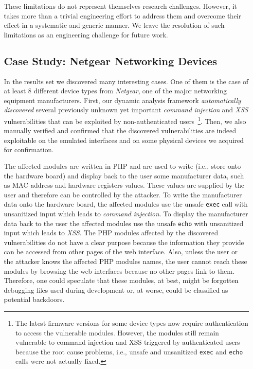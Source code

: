 \documentclass[conference]{./templates/ndss/IEEEtran}
\newcounter{t0d0_counter}
\newcounter{pr00f_counter}
\begin{document}
These limitations do not represent themselves research challenges. 
However, it takes more than a trivial engineering effort to address them 
and overcome their effect in a systematic and generic manner. 
We leave the resolution of such limitations as an engineering challenge 
for future work. 





\subsection{Case Study: Netgear Networking Devices}
\label{sec:discuss-casestudy-cmdinj}

\newcommand{\NetgearDeviceTypes}{8}

In the results set we discovered many interesting cases. One of them is the 
case of at least \NetgearDeviceTypes{} different device types from \emph{Netgear}, 
one of the major networking equipment manufacturers. 
First, our dynamic analysis framework \emph{automatically discovered} several 
previously unknown yet important \emph{command injection} and \emph{XSS} 
vulnerabilities that can be exploited by non-authenticated 
users~\footnote{The latest firmware versions for some device types now require 
authentication to access the vulnerable modules. However, the modules still 
remain vulnerable to command injection and XSS triggered by authenticated 
users because the root cause problems, i.e., unsafe and unsanitized 
\texttt{exec} and \texttt{echo} calls were not actually fixed.}. 
Then, we also manually verified and confirmed that the discovered 
vulnerabilities are indeed exploitable on the emulated interfaces and 
on some physical devices we acquired for confirmation. 

The affected modules are written in PHP and are used to write (i.e., store 
onto the hardware board) and display back to the user some manufacturer 
data, such as MAC address and hardware registers values. 
These values are supplied by the user and therefore can be controlled by the 
attacker. To write the manufacturer data onto the hardware board, the 
affected modules use the unsafe \texttt{exec} call with unsanitized input 
which leads to \emph{command injection}. To display the manufacturer data 
back to the user the affected modules use the unsafe \texttt{echo} with 
unsanitized input which leads to \emph{XSS}. 
    The PHP modules affected by the discovered vulnerabilities do not have 
a clear purpose because the information they provide can be accessed from other 
pages of the web interface. Also, unless the user or the attacker knows the 
affected PHP modules names, the user cannot reach these modules 
by browsing the web interfaces because no other pages link to them. 
Therefore, one could speculate that these modules, at best, might be 
forgotten debugging files used during development or, at worse, could be 
classified as potential backdoors. 
\end{document}
